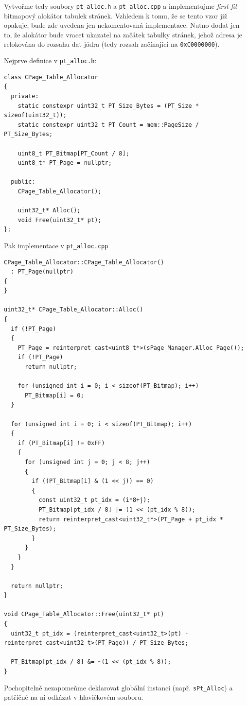 \documentclass{article}
\begin{document}
Vytvořme tedy soubory {\tt pt\_alloc.h} a {\tt pt\_alloc.cpp} a implementujme \emph{first-fit} bitmapový alokátor tabulek stránek. Vzhledem k tomu, že se tento vzor již opakuje, bude zde uvedena jen nekomentovaná implementace. Nutno dodat jen to, že alokátor bude vracet ukazatel na začátek tabulky stránek, jehož adresa je relokována do rozsahu dat jádra (tedy rozsah začínající na \texttt{0xC0000000}).

Nejprve definice v {\tt pt\_alloc.h}:
\begin{lstlisting}
class CPage_Table_Allocator
{
  private:
    static constexpr uint32_t PT_Size_Bytes = (PT_Size * sizeof(uint32_t));
    static constexpr uint32_t PT_Count = mem::PageSize / PT_Size_Bytes;

    uint8_t PT_Bitmap[PT_Count / 8];
    uint8_t* PT_Page = nullptr;
	
  public:
    CPage_Table_Allocator();

    uint32_t* Alloc();
    void Free(uint32_t* pt);
};
\end{lstlisting}

Pak implementace v {\tt pt\_alloc.cpp}
\begin{lstlisting}
CPage_Table_Allocator::CPage_Table_Allocator()
  : PT_Page(nullptr)
{
}

uint32_t* CPage_Table_Allocator::Alloc()
{
  if (!PT_Page)
  {
    PT_Page = reinterpret_cast<uint8_t*>(sPage_Manager.Alloc_Page());
    if (!PT_Page)
      return nullptr;

    for (unsigned int i = 0; i < sizeof(PT_Bitmap); i++)
      PT_Bitmap[i] = 0;
  }

  for (unsigned int i = 0; i < sizeof(PT_Bitmap); i++)
  {
    if (PT_Bitmap[i] != 0xFF)
    {
      for (unsigned int j = 0; j < 8; j++)
      {
        if ((PT_Bitmap[i] & (1 << j)) == 0)
        {
          const uint32_t pt_idx = (i*8+j);
          PT_Bitmap[pt_idx / 8] |= (1 << (pt_idx % 8));
          return reinterpret_cast<uint32_t*>(PT_Page + pt_idx * PT_Size_Bytes);
        }
      }
    }
  }

  return nullptr;
}

void CPage_Table_Allocator::Free(uint32_t* pt)
{
  uint32_t pt_idx = (reinterpret_cast<uint32_t>(pt) - reinterpret_cast<uint32_t>(PT_Page)) / PT_Size_Bytes;

  PT_Bitmap[pt_idx / 8] &= ~(1 << (pt_idx % 8));
}
\end{lstlisting}

Pochopitelně nezapomeňme deklarovat globální instanci (např. {\tt sPt\_Alloc}) a patřičně na ni odkázat v hlavičkovém souboru.
\end{document}
